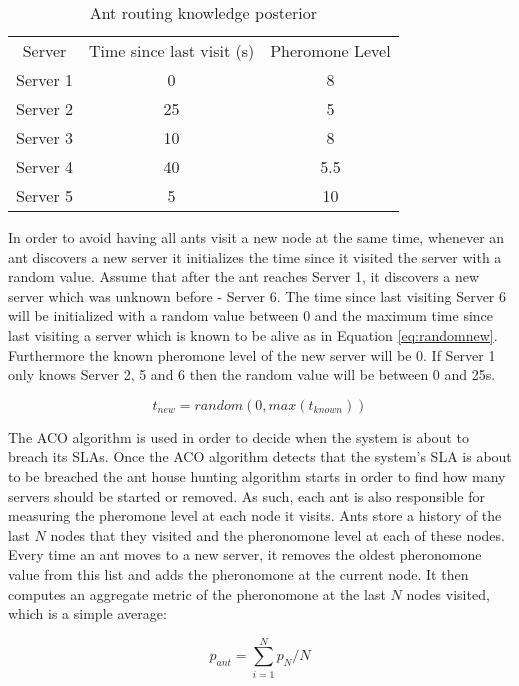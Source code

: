 \begin{table}[]
\centering
\begin{tabular}{c|c|c}
Server & Time since last visit (s) & Pheromone Level \\
Server 1 & 0 & 8 \\
Server 2 & 25 & 5 \\
Server 3 & 10 & 8 \\
Server 4 & 40 & 5.5 \\
Server 5 & 5 & 10 \\
\end{tabular}
\caption{Ant routing knowledge posterior}
\label{tab:ant_post}
\end{table}

In order to avoid having all ants visit a new node at the same time, whenever an ant discovers a new server it initializes the time since it visited the server with a random value. Assume that after the ant reaches Server 1, it discovers a new server which was unknown before - Server 6. The time since last visiting Server 6 will be initialized with a random value between 0 and the maximum time since last visiting a server which is known to be alive as in Equation \ref{eq:randomnew}. Furthermore the known pheromone level of the new server will be 0. If Server 1 only knows Server 2, 5 and 6 then the random value will be between 0 and 25s.

\begin{equation}
t_{new} = random(0, max(t_{known}))
\label{eq:randomnew}
\end{equation}

The ACO algorithm is used in order to decide when the system is about to breach its SLAs. Once the ACO algorithm detects that the system's SLA is about to be breached the ant house hunting algorithm starts in order to find how many servers should be started or removed. As such, each ant is also responsible for measuring the pheromone level at each node it visits. Ants store a history of the last $N$ nodes that they visited and the pheronomone level at each of these nodes. Every time an ant moves to a new server, it removes the oldest pheronomone value from this list and adds the pheronomone at the current node. It then computes an aggregate metric of the pheronomone at the last $N$ nodes visited, which is a simple average:

\begin{equation}
p_{ant} = \sum_{i=1}^{N} p_{N} / N
\end{equation}

